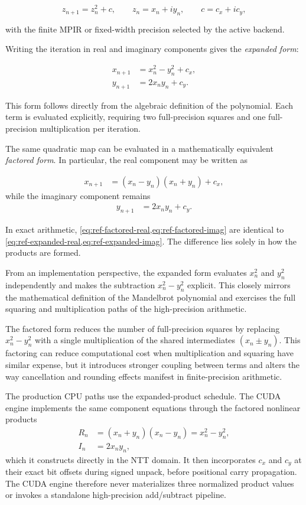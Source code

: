 \[
z_{n+1} = z_n^2 + c,
\qquad
z_n = x_n + i y_n,
\qquad
c = c_x + i c_y,
\]

with the finite MPIR or fixed-width  precision selected by
the active backend.

Writing the iteration in real and imaginary components gives the
\emph{expanded form}:

\begin{align}
x_{n+1} &= x_n^2 - y_n^2 + c_x, \label{eq:ref-expanded-real} \\
y_{n+1} &= 2 x_n y_n + c_y. \label{eq:ref-expanded-imag}
\end{align}

This form follows directly from the algebraic definition of the polynomial.
Each term is evaluated explicitly, requiring two full-precision squares and
one full-precision multiplication per iteration.

The same quadratic map can be evaluated in a mathematically equivalent
\emph{factored form}. In particular, the real component may be written as

\begin{align}
x_{n+1}
&= (x_n - y_n)(x_n + y_n) + c_x, \label{eq:ref-factored-real}
\end{align}
while the imaginary component remains
\begin{align}
y_{n+1} &= 2 x_n y_n + c_y. \label{eq:ref-factored-imag}
\end{align}

In exact arithmetic, \cref{eq:ref-factored-real,eq:ref-factored-imag} are
identical to \cref{eq:ref-expanded-real,eq:ref-expanded-imag}. The difference
lies solely in how the products are formed.

From an implementation perspective, the expanded form evaluates
$x_n^2$ and $y_n^2$ independently and makes the subtraction
$x_n^2 - y_n^2$ explicit. This closely mirrors the mathematical definition
of the Mandelbrot polynomial and exercises the full squaring and
multiplication paths of the high-precision arithmetic.

The factored form reduces the number of full-precision squares by replacing
$x_n^2 - y_n^2$ with a single multiplication of the shared intermediates
$(x_n \pm y_n)$. This factoring can reduce computational cost when multiplication and
squaring have similar expense, but it introduces stronger coupling between
terms and alters the way cancellation and rounding effects manifest in
finite-precision arithmetic.

The production CPU paths use the expanded-product schedule.  The CUDA engine
implements the same component equations through the factored nonlinear products
\begin{align}
R_n &= (x_n+y_n)(x_n-y_n)=x_n^2-y_n^2, \\
I_n &= 2x_ny_n,
\end{align}
which it constructs directly in the NTT domain.  It then incorporates $c_x$ and
$c_y$ at their exact bit offsets during signed unpack, before positional carry
propagation.  The CUDA engine therefore never materializes three normalized
product values or invokes a standalone high-precision add/subtract pipeline.

